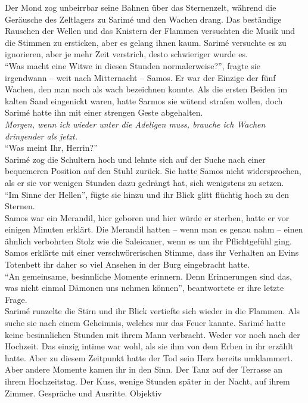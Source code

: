 Der Mond zog unbeirrbar seine Bahnen über das Sternenzelt, während die Geräusche des Zeltlagers zu 
Sarimé und den Wachen drang. Das beständige Rauschen der Wellen und das Knistern der Flammen 
versuchten die Musik und die Stimmen zu ersticken, aber es gelang ihnen kaum. Sarimé versuchte es 
zu ignorieren, aber je mehr Zeit verstrich, desto schwieriger wurde es. \\
``Was macht eine Witwe in diesen Stunden normalerweise?'', fragte sie irgendwann – weit nach 
Mitternacht – Samos. Er war der Einzige der fünf Wachen, den man noch als wach bezeichnen konnte. 
Als die ersten Beiden im kalten Sand eingenickt waren, hatte Sarmos sie wütend strafen wollen, doch 
Sarimé hatte ihn mit einer strengen Geste abgehalten.\\
\textit{Morgen, wenn ich wieder unter die Adeligen muss, brauche ich Wachen dringender als jetzt.}\\
``Was meint Ihr, Herrin?''\\
Sarimé zog die Schultern hoch und lehnte sich auf der Suche nach einer bequemeren Position auf den 
Stuhl zurück. Sie hatte Samos nicht widersprochen, als er sie vor wenigen Stunden dazu gedrängt 
hat, sich wenigstens zu setzen. \\
``Im Sinne der Hellen'', fügte sie hinzu und ihr Blick glitt flüchtig hoch zu den Sternen.\\
Samos war ein Merandil, hier geboren und hier würde er sterben, hatte er vor einigen Minuten 
erklärt. Die Merandil hatten – wenn man es genau nahm – einen ähnlich verbohrten Stolz wie die 
Saleicaner, wenn es um ihr Pflichtgefühl ging. Samos erklärte mit einer verschwörerischen Stimme, 
dass ihr Verhalten an Evins Totenbett ihr daher so viel Ansehen in der Burg eingebracht hatte. \\
``An gemeinsame, besinnliche Momente erinnern. Denn Erinnerungen sind das, was nicht einmal Dämonen 
uns nehmen können'', beantwortete er ihre letzte Frage.\\
Sarimé runzelte die Stirn und ihr Blick vertiefte sich wieder in die Flammen. Als suche sie nach 
einem Geheimnis, welches nur das Feuer kannte. Sarimé hatte keine besinnlichen Stunden mit ihrem 
Mann verbracht. Weder vor noch nach der Hochzeit. Das einzig intime war wohl, als sie ihm von dem 
Erben in ihr erzählt hatte. Aber zu diesem Zeitpunkt hatte der Tod sein Herz bereits umklammert.
Aber andere Momente kamen ihr in den Sinn. Der Tanz auf der Terrasse an ihrem Hochzeitstag. Der 
Kuss, wenige Stunden später in der Nacht, auf ihrem Zimmer. Gespräche und Ausritte. Objektiv 
